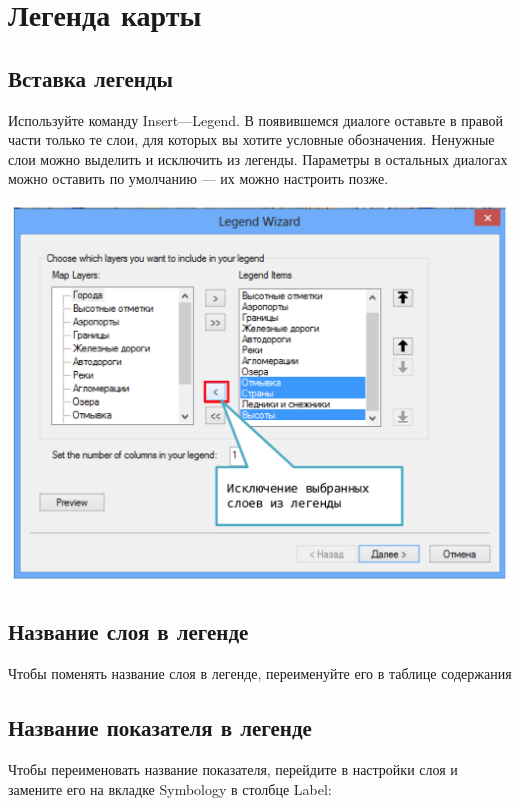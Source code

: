 \documentclass[12pt,]{book}
\begin{document}
\hypertarget{manual-legend}{%
\chapter{Легенда карты}\label{manual-legend}}

\hypertarget{section-55}{%
\section{Вставка легенды}\label{section-55}}

Используйте команду Insert---Legend. В появившемся диалоге оставьте в правой части только те слои, для которых вы хотите условные обозначения. Ненужные слои можно выделить и исключить из легенды. Параметры в остальных диалогах можно оставить по умолчанию --- их можно настроить позже.

\includegraphics{images/Appendix/image57.png}

\hypertarget{section-56}{%
\section{Название слоя в легенде}\label{section-56}}

Чтобы поменять название слоя в легенде, переименуйте его в таблице содержания

\hypertarget{section-57}{%
\section{Название показателя в легенде}\label{section-57}}

Чтобы переименовать название показателя, перейдите в настройки слоя и замените его на вкладке Symbology в столбце Label:
\end{document}
